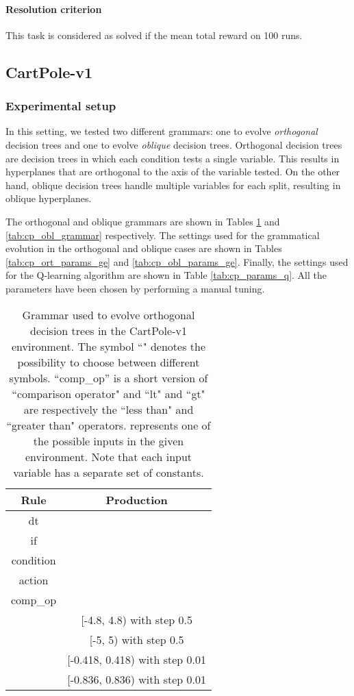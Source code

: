 \documentclass[review,english]{elsarticle}
\begin{document}
\paragraph{Resolution criterion}
This task is considered as solved if the mean total reward  on 100 runs.

\subsection{CartPole-v1}
\subsubsection{Experimental setup}
In this setting, we tested two different grammars: one to evolve \textit{orthogonal} decision trees and one to evolve \textit{oblique} decision trees.
Orthogonal decision trees are decision trees in which each condition tests a single variable. This results in hyperplanes that are orthogonal to the axis of the variable tested.
On the other hand, oblique decision trees handle multiple variables for each split, resulting in oblique hyperplanes.

The orthogonal and oblique grammars are shown in Tables \ref{tab:cp_ort_grammar} and \ref{tab:cp_obl_grammar} respectively.
The settings used for the grammatical evolution in the orthogonal and oblique cases are shown in Tables \ref{tab:cp_ort_params_ge} and \ref{tab:cp_obl_params_ge}.
Finally, the settings used for the Q-learning algorithm are shown in Table \ref{tab:cp_params_q}.
All the parameters have been chosen by performing a manual tuning.

\begin{table}
    \centering
    \begin{tabular}{|c|c|} \hline
        \textbf{Rule} & \textbf{Production} \\ \hline
        dt &  \\ if &  \\ condition &  \\ action &  \\ comp\_op &  \\  & [-4.8, 4.8) with step 0.5 \\  & [-5, 5) with step 0.5 \\  & [-0.418, 0.418) with step 0.01 \\  & [-0.836, 0.836) with step 0.01 \\ \hline
    \end{tabular}
    \caption{Grammar used to evolve orthogonal decision trees in the CartPole-v1 environment. The symbol ``" denotes the possibility to choose between different symbols. ``comp\_op'' is a short version of ``comparison operator" and ``lt" and ``gt" are respectively the ``less than" and ``greater than" operators.  represents one of the possible inputs in the given environment. Note that each input variable has a separate set of constants.}
    \label{tab:cp_ort_grammar}
\end{table}
\end{document}
